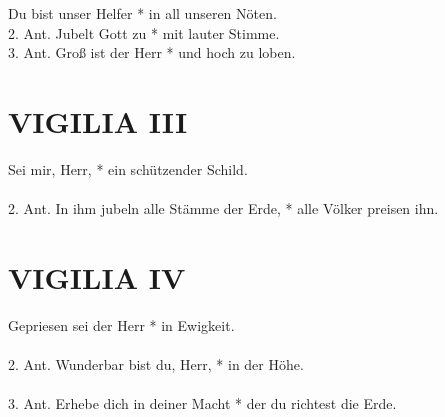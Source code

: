 \begin{sloppypar}
{ Du bist unser Helfer * in all unseren Nöten. \\
2. Ant. Jubelt Gott zu * mit lauter Stimme. \\
3. Ant. Groß ist der Herr *  und hoch zu loben.\\ }
\end{sloppypar}

\begin{flushleft}


\end{flushleft}


\section{VIGILIA III}

\begin{sloppypar}

{ Sei mir, Herr, * ein schützender Schild.\\ \\
2. Ant. In ihm jubeln alle Stämme der Erde, * alle Völker preisen ihn. \\}
\end{sloppypar}

\medskip

\begin{flushleft}


\end{flushleft}


\section{VIGILIA IV}

\begin{sloppypar}

{ Gepriesen sei der Herr * in Ewigkeit.\\ \\
2. Ant. Wunderbar bist du, Herr, * in der Höhe.\\ \\
3. Ant. Erhebe dich in deiner Macht * der du richtest die Erde. \\}
\end{sloppypar}

